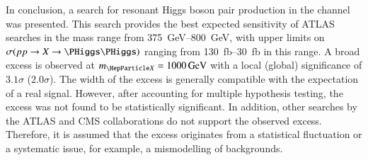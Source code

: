 %
%
%
%

In conclusion, a search for resonant Higgs boson pair production in the
\bbtautau channel was presented. This search provides the best expected
sensitivity of ATLAS searches in the mass range from \SIrange{375}{800}{\GeV},
with upper limits on $\sigma(\pp \to X \to \HH)$ ranging from
\SIrange{130}{30}{\femto\barn} in this range. A broad excess is observed at
$\mX = \SI{1000}{\GeV}$ with a local (global) significance of $3.1\sigma$
($2.0\sigma$). The width of the excess is generally compatible with the
expectation of a real signal. However, after accounting for multiple hypothesis
testing, the excess was not found to be statistically significant. In addition,
other searches by the ATLAS and CMS collaborations do not support the observed
excess. Therefore, it is assumed that the excess originates from a statistical
fluctuation or a systematic issue, for example, a mismodelling of backgrounds.


